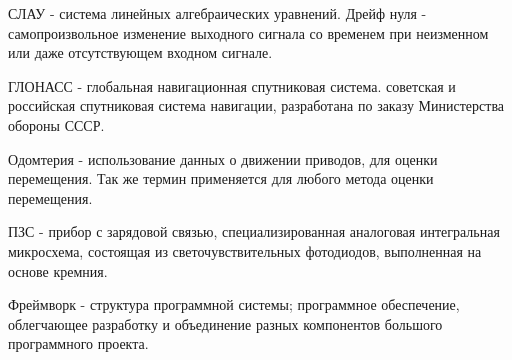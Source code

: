 СЛАУ - система линейных алгебраических уравнений.
Дрейф нуля - самопроизвольное изменение выходного сигнала со временем при неизменном или даже отсутствующем входном сигнале.

ГЛОНАСС - глобальная навигационная спутниковая система. советская и российская спутниковая система навигации, разработана по заказу Министерства обороны СССР.

Одомтерия - использование данных о движении приводов, для оценки перемещения. Так же термин применяется для любого метода оценки перемещения.

ПЗС - прибор с зарядовой связью, специализированная аналоговая интегральная микросхема, состоящая из светочувствительных фотодиодов, выполненная на основе кремния.

Фреймворк - структура программной системы; программное обеспечение, облегчающее разработку и объединение разных компонентов большого программного проекта.